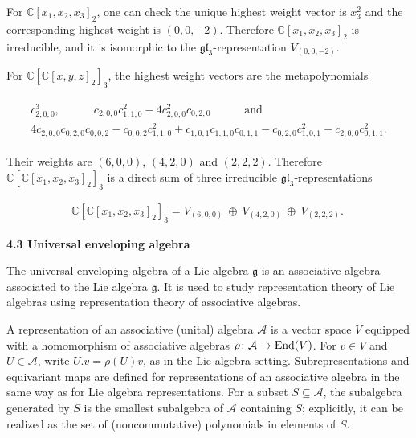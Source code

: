 For $\mathbb{C}[x_{1},x_{2},x_{3}]_{2}$, one can check the unique highest weight vector is $x_{3}^{2}$ and the corresponding highest weight is $(0,0,-2)$. Therefore $\mathbb{C}[x_{1},x_{2},x_{3}]_{2}$ is irreducible, and it is isomorphic to the $\mathfrak{gl}_{3}$-representation $V_{(0,0,-2)}$.





For $\mathbb{C}[\mathbb{C}[x,y,z]_{2}]_{3}$, the highest weight vectors are the metapolynomials



\[\begin{aligned}
\begin{gathered}c_{2,0,0}^{3},\qquad\quad c_{2,0,0}c_{1,1,0}^{2}-4c_{2,0,0}^{2}c_{0,2,0}\qquad\quad\text{and}\\ 4c_{2,0,0}c_{0,2,0}c_{0,0,2}-c_{0,0,2}c_{1,1,0}^{2}+c_{1,0,1}c_{1,1,0}c_{0,1,1}-c_{0,2,0}c_{1,0,1}^{2}-c_{2,0,0}c_{0,1,1}^{2}.\end{gathered}
\end{aligned}\]


Their weights are $(6,0,0)$, $(4,2,0)$ and $(2,2,2)$. Therefore $\mathbb{C}[\mathbb{C}[x_{1},x_{2},x_{3}]_{2}]_{3}$ is a direct sum of three irreducible $\mathfrak{gl}_{3}$-representations



\[\begin{aligned}
\mathbb{C}[\mathbb{C}[x_{1},x_{2},x_{3}]_{2}]_{3}=V_{(6,0,0)}\ \oplus\ V_{(4,2,0)}\ \oplus\ V_{(2,2,2)}.\ 
\end{aligned}\]






\par\medskip\noindent\textbf{4.3 Universal enveloping algebra}\par




The universal enveloping algebra of a Lie algebra $\mathfrak{g}$ is an associative algebra associated to the Lie algebra $\mathfrak{g}$. It is used to study representation theory of Lie algebras using representation theory of associative algebras.





A representation of an associative (unital) algebra $\mathcal{A}$ is a vector space $V$ equipped with a homomorphism of associative algebras $\rho\colon\mathcal{A}\to\textnormal{End}(V)$. For $v\in V$ and $U\in\mathcal{A}$, write $U.v=\rho(U)v$, as in the Lie algebra setting. Subrepresentations and equivariant maps are defined for representations of an associative algebra in the same way as for Lie algebra representations. For a subset $S\subseteq\mathcal{A}$, the subalgebra generated by $S$ is the smallest subalgebra of $\mathcal{A}$ containing $S$; explicitly, it can be realized as the set of (noncommutative) polynomials in elements of $S$.






